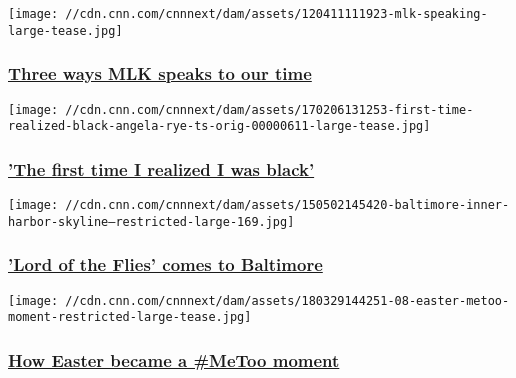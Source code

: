 \href{/2018/01/12/us/mlk-relevance-today/index.html}{}

\texttt{[image: //cdn.cnn.com/cnnnext/dam/assets/120411111923-mlk-speaking-large-tease.jpg]}

\hypertarget{three-ways-mlk-speaks-to-our-time}{%
\subsubsection{\texorpdfstring{\href{/2018/01/12/us/mlk-relevance-today/index.html}{Three
ways MLK speaks to our
time}}{Three ways MLK speaks to our time}}\label{three-ways-mlk-speaks-to-our-time}}

\href{http://www.cnn.com/interactive/2017/02/us/first-time-i-realized-i-was-black/}{}

\texttt{[image: //cdn.cnn.com/cnnnext/dam/assets/170206131253-first-time-realized-black-angela-rye-ts-orig-00000611-large-tease.jpg]}

\hypertarget{the-first-time-i-realized-i-was-black}{%
\subsubsection{\texorpdfstring{\href{http://www.cnn.com/interactive/2017/02/us/first-time-i-realized-i-was-black/}{'The
first time I realized I was
black'}}{'The first time I realized I was black'}}\label{the-first-time-i-realized-i-was-black}}

\href{/2015/05/02/us/lord-of-the-flies-baltimore/index.html}{}

\texttt{[image: //cdn.cnn.com/cnnnext/dam/assets/150502145420-baltimore-inner-harbor-skyline---restricted-large-169.jpg]}

\hypertarget{lord-of-the-flies-comes-to-baltimore}{%
\subsubsection{\texorpdfstring{\href{/2015/05/02/us/lord-of-the-flies-baltimore/index.html}{'Lord
of the Flies' comes to
Baltimore}}{'Lord of the Flies' comes to Baltimore}}\label{lord-of-the-flies-comes-to-baltimore}}

\href{/2018/03/30/world/easter-metoo-jesus/index.html}{}

\texttt{[image: //cdn.cnn.com/cnnnext/dam/assets/180329144251-08-easter-metoo-moment-restricted-large-tease.jpg]}

\hypertarget{how-easter-became-a-metoo-moment}{%
\subsubsection{\texorpdfstring{\href{/2018/03/30/world/easter-metoo-jesus/index.html}{How
Easter became a \#MeToo
moment}}{How Easter became a \#MeToo moment}}\label{how-easter-became-a-metoo-moment}}

